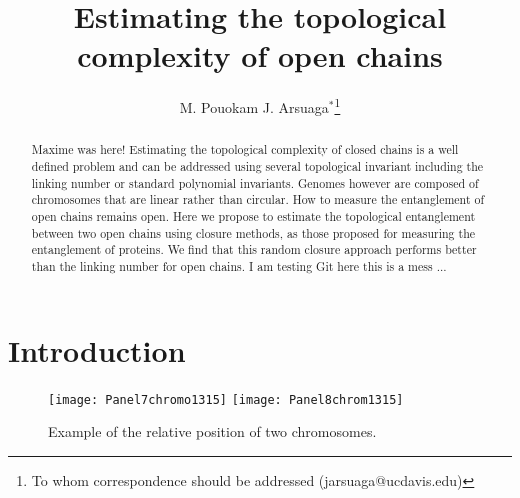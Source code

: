 \documentclass{iopart}
\begin{document}
\title[Estimating the topological complexity of open chains]{Estimating the topological complexity of open chains}

\author{M. Pouokam J. Arsuaga$^\ast$\footnote[1]{To whom correspondence should be addressed
(jarsuaga@ucdavis.edu)}}
\address{$^\ast$Department of Mathematics \& \\
Department of Molecular and Cellular Biology\\
University of California at Davis\\
Davis, CA 95616}

\begin{abstract}
Maxime was here!
Estimating the topological complexity of closed chains is a well defined problem and can be addressed using several topological invariant including the linking number or standard polynomial invariants. Genomes however are composed of chromosomes that are linear rather than circular. How to measure the entanglement of open chains remains open. Here we propose to estimate the topological entanglement between two open chains using closure methods, as those proposed for measuring the entanglement of proteins. We find that this random closure approach performs better than the linking number for open chains. 
I am testing Git here
this is a mess ...


\end{abstract}





\section{Introduction}
\begin{figure}[!htb]
\begin{center}
\texttt{[image: Panel7chromo1315]}
\texttt{[image: Panel8chrom1315]}
\end{center}
\caption{Example of the relative position of two chromosomes.
\label{2Chroms}}
\end{figure}
\end{document}
